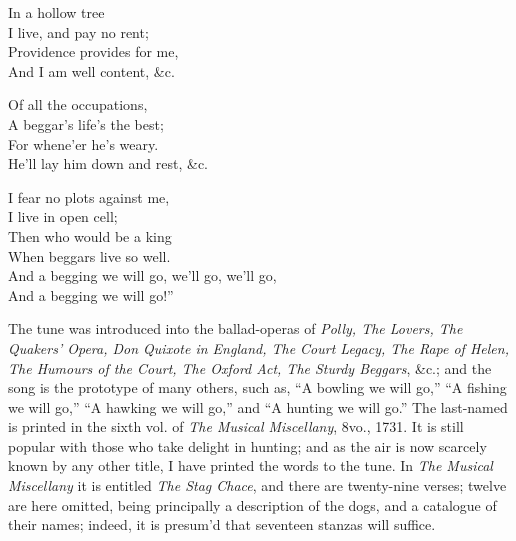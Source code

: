 \begin{dcverse}
\begin{patverse}
\vin In a hollow tree\\
I live, and pay no rent;\\
Providence provides for me,\\
And I am well content, \&c.
\end{patverse}

\begin{patverse}
\vin Of all the occupations,\\
A beggar’s life’s the best;\\
For whene’er he’s weary.\\
He’ll lay him down and rest, \&c.
\end{patverse}

\begin{patverse}
\vin I fear no plots against me,\\
I live in open cell;\\
Then who would be a king\\
When beggars live so well.\\
And a begging we will go, we’ll go, we’ll go,\\
And a begging we will go!”
\end{patverse}
\end{dcverse}
\pagebreak

The tune was introduced into the ballad-operas of \textit{Polly, The Lovers, The
Quakers’ Opera, Don Quixote in England, The Court Legacy, The Rape of Helen,
The Humours of the Court, The Oxford Act, The Sturdy Beggars}, \&c.; and the
song is the prototype of many others, such as, “A bowling we will go,” “A fishing
we will go,” “A hawking we will go,” and “A hunting we will go.” The
last-named is printed in the sixth vol. of \textit{The Musical Miscellany}, 8vo., 1731.
It is still popular with those who take delight in hunting; and as the air is now
scarcely known by any other title, I have printed the words to the tune. In
\textit{The Musical Miscellany} it is entitled \textit{The Stag Chace}, and there are twenty-nine
verses; twelve are here omitted, being principally a description of the dogs,
and a catalogue of their names; indeed, it is presum’d that seventeen stanzas
will suffice.



